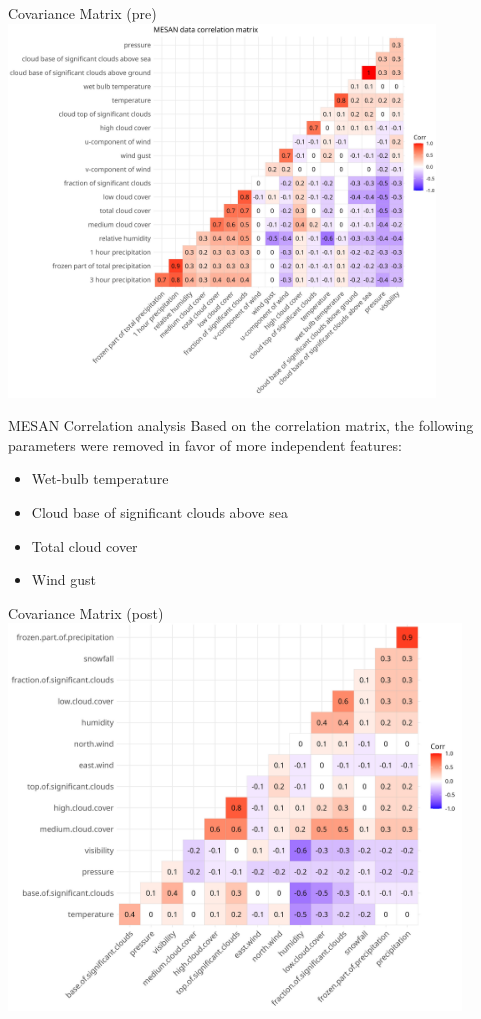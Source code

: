\documentclass[10pt]{beamer}
\begin{document}
\begin{frame}{Covariance Matrix (pre)}
\includegraphics[width=0.85\textwidth]{figures/mesan-analysis-matrix-pre}
\end{frame}


\begin{frame}{MESAN Correlation analysis}
Based on the correlation matrix, the following parameters were removed in favor of more independent features:
\begin{itemize}
	\item Wet-bulb temperature
	\item Cloud base of significant clouds above sea
	\item Total cloud cover
	\item Wind gust
\end{itemize}
\end{frame}


\begin{frame}{Covariance Matrix (post)}
\includegraphics[width=0.9\textwidth]{figures/mesan-analysis-matrix-post}
\end{frame}
\end{document}
